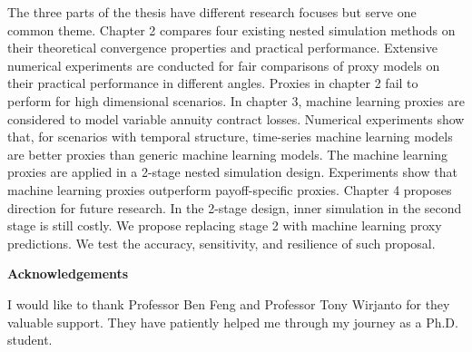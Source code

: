 The three parts of the thesis have different research focuses but serve one common theme.
Chapter 2 compares four existing nested simulation methods on their theoretical convergence properties and practical performance. 
Extensive numerical experiments are conducted for fair comparisons of proxy models on their practical performance in different angles. 
Proxies in chapter 2 fail to perform for high dimensional scenarios. 
In chapter 3, machine learning proxies are considered to model variable annuity contract losses.
Numerical experiments show that, for scenarios with temporal structure, time-series machine learning models are better proxies than generic machine learning models. 
The machine learning proxies are applied in a 2-stage nested simulation design. 
Experiments show that machine learning proxies outperform payoff-specific proxies.
Chapter 4 proposes direction for future research. In the 2-stage design, inner simulation in the second stage is still costly. 
We propose replacing stage 2 with machine learning proxy predictions. 
We test the accuracy, sensitivity, and resilience of such proposal.

\cleardoublepage


\begin{center}\textbf{Acknowledgements}\end{center}

I would like to thank Professor Ben Feng and Professor Tony Wirjanto for they valuable support. They have patiently helped me through my journey as a Ph.D. student.  
\cleardoublepage

\renewcommand\contentsname{Table of Contents}
\tableofcontents
\cleardoublepage
{}    %

\listoftables
\cleardoublepage
{}		%

\listoffigures
\cleardoublepage
{}		%

\printglossaries
\cleardoublepage
{}		%


